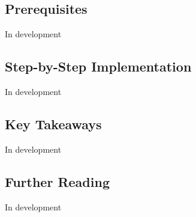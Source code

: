 \documentclass[
  letterpaper,
  DIV=11,
  numbers=noendperiod,
  oneside]{scrartcl}
\begin{document}
\subsection{Prerequisites}\label{prerequisites}

In development

\subsection{Step-by-Step
Implementation}\label{step-by-step-implementation}

In development

\subsection{Key Takeaways}\label{key-takeaways}

In development

\subsection{Further Reading}\label{further-reading}

In development
\end{document}
